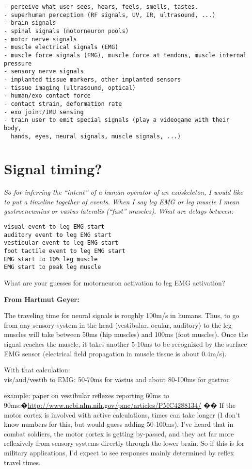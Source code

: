 \documentclass[letterpaper,12pt,fullpage]{article}
\begin{document}
\begin{verbatim}
- perceive what user sees, hears, feels, smells, tastes.
- superhuman perception (RF signals, UV, IR, ultrasound, ...)
- brain signals
- spinal signals (motorneuron pools)
- motor nerve signals
- muscle electrical signals (EMG)
- muscle force signals (FMG), muscle force at tendons, muscle internal pressure
- sensory nerve signals
- implanted tissue markers, other implanted sensors
- tissue imaging (ultrasound, optical)
- human/exo contact force
- contact strain, deformation rate
- exo joint/IMU sensing
- train user to emit special signals (play a videogame with their body,
  hands, eyes, neural signals, muscle signals, ...)
\end{verbatim}

\section{Signal timing?}

{\it So for inferring the ``intent'' of a human operator of an
exoskeleton,
I would like to put a timeline together of events.
When I say leg EMG or leg muscle I mean
gastrocneumius or vastus lateralis (``fast'' muscles).
What are delays between:
\begin{verbatim}
visual event to leg EMG start
auditory event to leg EMG start
vestibular event to leg EMG start
foot tactile event to leg EMG start
EMG start to 10% leg muscle
EMG start to peak leg muscle
\end{verbatim}
What are your guesses for motorneuron activation to leg EMG activation?
}

{\bf From Hartmut Geyer:}

The traveling time for neural signals is roughly 100m/s in humans.
Thus, to go from any sensory system in the head (vestibular, ocular,
auditory) to the leg muscles will take between 50ms (hip muscles) and
100ms (foot muscles). Once the signal reaches the muscle, it takes
another 5-10ms to be recognized by the surface EMG sensor (electrical
field propagation in muscle tissue is about 0.4m/s).

With that calculation:\\
vis/aud/vestib to EMG: 50-70ms for vastus and about 80-100ms for
gastroc

example: paper on vestibular reflexes reporting 60ms to
90ms:�\url{http://www.ncbi.nlm.nih.gov/pmc/articles/PMC4288134/}
��
If the motor cortex is involved with active calculations, times can
take longer (I don't know numbers for this, but would guess adding
50-100ms). I've heard that in combat soldiers, the motor cortex is
getting by-passed, and they act far more reflexively from sensory
systems directly through the lower brain. So if this is for military
applications, I'd expect to see responses mainly determined by
reflex travel times.
\end{document}
